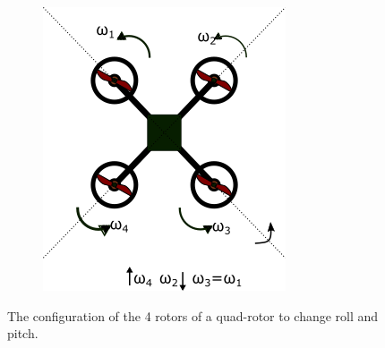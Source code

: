 \documentclass[hidelinks,BTech]{iitmdiss}
\begin{document}
\begin{figure}[H]
\begin{subfigure}[c]{0.45\textwidth}
        \includegraphics[width=\textwidth]{Quadrotor_pitch.png}
        \caption{}
    \end{subfigure}
    \caption{The configuration of the 4 rotors of a quad-rotor to change roll and pitch.}
\end{figure}
\end{document}
